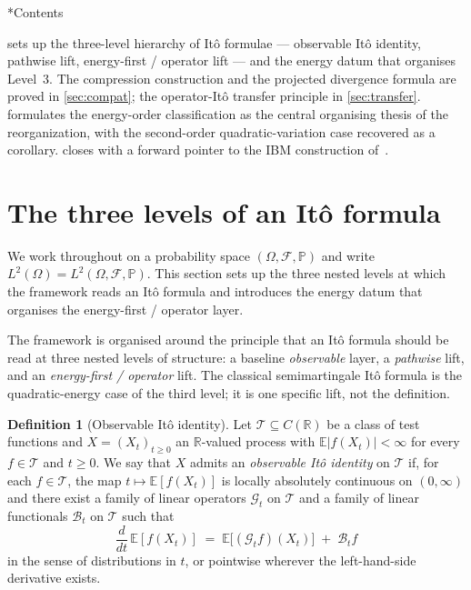 \documentclass[11pt,reqno]{amsart}
\makeatletter
\renewcommand\subsection{\@startsection{subsection}{2}%
  \z@{.7\linespacing}{.5\linespacing}%
  {\normalfont\centering\scshape}}
\theoremstyle{plain}
\theoremstyle{definition}
\newtheorem{definition}[theorem]{Definition}
\theoremstyle{remark}
\newcommand{\R}{\mathbb{R}}
\newcommand{\E}{\mathbb{E}}
\newcommand{\Prob}{\mathbb{P}}
\makeatother
\begin{document}
\subsection*{Contents}

 sets up the three-level hierarchy of It\^o
formulae --- observable It\^o identity, pathwise lift, energy-first /
operator lift --- and the energy datum that organises Level~3. The
compression construction and the projected divergence formula are
proved in \cref{sec:compat}; the operator-It\^o transfer principle in
\cref{sec:transfer}.  formulates the
energy-order classification as the central organising thesis of the
reorganization, with the second-order quadratic-variation case
recovered as a corollary.  closes with a forward
pointer to the IBM construction of~\cite{IBMPaper}.

\section{The three levels of an It\^o formula}\label{sec:operator}

We work throughout on a probability space $(\Omega,\mathcal F,\Prob)$
and write $L^2(\Omega)=L^2(\Omega,\mathcal F,\Prob)$. This section sets
up the three nested levels at which the framework reads an It\^o
formula and introduces the energy datum that organises the
energy-first / operator layer.

The framework is organised around the principle that an It\^o formula
should be read at three nested levels of structure: a baseline
\emph{observable} layer, a \emph{pathwise} lift, and an
\emph{energy-first / operator} lift. The classical semimartingale
It\^o formula is the quadratic-energy case of the third level; it is
one specific lift, not the definition.

\begin{definition}[Observable It\^o identity]\label{def:obs-ito-identity}
Let $\mathcal T\subseteq C(\R)$ be a class of test functions and
$X=(X_t)_{t\ge 0}$ an $\R$-valued process with
$\E|f(X_t)|<\infty$ for every $f\in\mathcal T$ and $t\ge 0$. We
say that $X$ admits an \emph{observable It\^o identity} on
$\mathcal T$ if, for each $f\in\mathcal T$, the map
$t\mapsto\E[f(X_t)]$ is locally absolutely continuous on
$(0,\infty)$ and there exist a family of linear operators
$\mathcal G_t$ on $\mathcal T$ and a family of linear functionals
$\mathcal B_t$ on $\mathcal T$ such that
\begin{equation}\label{eq:obs-ito-identity}
  \frac{d}{dt}\,\E[f(X_t)]
   \;=\;\E\bigl[(\mathcal G_t f)(X_t)\bigr]
   \;+\;\mathcal B_t f
\end{equation}
in the sense of distributions in $t$, or pointwise wherever the
left-hand-side derivative exists.
\end{definition}
\end{document}
